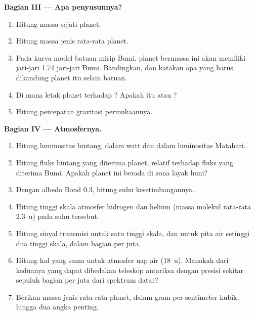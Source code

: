 \begin{problem}
\medskip\noindent\textbf{Bagian III --- Apa penyusunnya?}
\begin{enumerate}[resume]
\item Hitung massa sejati planet.
\item Hitung massa jenis rata-rata planet.
\item Pada kurva model batuan mirip Bumi, planet bermassa ini akan
  memiliki jari-jari 1.74 jari-jari Bumi. Bandingkan, dan katakan apa yang harus
  dikandung planet itu selain batuan.
\item Di mana letak planet terhadap ? Apakah itu
   atau ?
\item Hitung percepatan gravitasi permukaannya.
\end{enumerate}

\medskip\noindent\textbf{Bagian IV --- Atmosfernya.}
\begin{enumerate}[resume]
\item Hitung luminositas bintang, dalam watt dan dalam
  luminositas Matahari.
\item Hitung fluks bintang yang diterima planet, relatif terhadap fluks
  yang diterima Bumi. Apakah planet ini berada di zona layak huni?
\item Dengan albedo Bond 0.3, hitung suhu kesetimbangannya.
\item Hitung tinggi skala atmosfer hidrogen dan helium
  (massa molekul rata-rata \qty{2.3}{u}) pada suhu tersebut.
\item Hitung sinyal transmisi untuk satu tinggi skala, dan untuk pita
  air setinggi dua tinggi skala, dalam bagian per juta.
\item Hitung hal yang sama untuk atmosfer uap air (\qty{18}{u}). Manakah dari
  keduanya yang dapat dibedakan teleskop antariksa dengan presisi sekitar sepuluh bagian per
  juta dari spektrum datar?
\item Berikan massa jenis rata-rata planet, dalam gram per sentimeter kubik, hingga
  dua angka penting.
\end{enumerate}
\end{problem}
